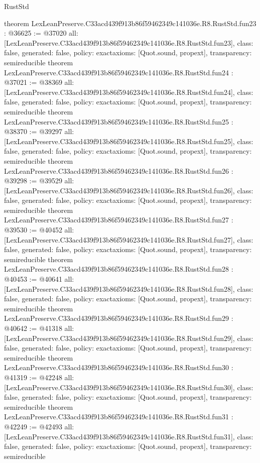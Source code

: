 \begin{lexlean}{RustStd}
\begin{coremodule}
{}
theorem LexLeanPreserve.C33acd439f913b86f59462349c141036e.R8.RustStd.fun23 : @36625 := @37020 {
  all: [LexLeanPreserve.C33acd439f913b86f59462349c141036e.R8.RustStd.fun23],
  class: false,
  generated: false,
  policy: exact{axioms: [Quot.sound, propext]},
  transparency: semireducible
}
theorem LexLeanPreserve.C33acd439f913b86f59462349c141036e.R8.RustStd.fun24 : @37021 := @38369 {
  all: [LexLeanPreserve.C33acd439f913b86f59462349c141036e.R8.RustStd.fun24],
  class: false,
  generated: false,
  policy: exact{axioms: [Quot.sound, propext]},
  transparency: semireducible
}
theorem LexLeanPreserve.C33acd439f913b86f59462349c141036e.R8.RustStd.fun25 : @38370 := @39297 {
  all: [LexLeanPreserve.C33acd439f913b86f59462349c141036e.R8.RustStd.fun25],
  class: false,
  generated: false,
  policy: exact{axioms: [Quot.sound, propext]},
  transparency: semireducible
}
theorem LexLeanPreserve.C33acd439f913b86f59462349c141036e.R8.RustStd.fun26 : @39298 := @39529 {
  all: [LexLeanPreserve.C33acd439f913b86f59462349c141036e.R8.RustStd.fun26],
  class: false,
  generated: false,
  policy: exact{axioms: [Quot.sound, propext]},
  transparency: semireducible
}
theorem LexLeanPreserve.C33acd439f913b86f59462349c141036e.R8.RustStd.fun27 : @39530 := @40452 {
  all: [LexLeanPreserve.C33acd439f913b86f59462349c141036e.R8.RustStd.fun27],
  class: false,
  generated: false,
  policy: exact{axioms: [Quot.sound, propext]},
  transparency: semireducible
}
theorem LexLeanPreserve.C33acd439f913b86f59462349c141036e.R8.RustStd.fun28 : @40453 := @40641 {
  all: [LexLeanPreserve.C33acd439f913b86f59462349c141036e.R8.RustStd.fun28],
  class: false,
  generated: false,
  policy: exact{axioms: [Quot.sound, propext]},
  transparency: semireducible
}
theorem LexLeanPreserve.C33acd439f913b86f59462349c141036e.R8.RustStd.fun29 : @40642 := @41318 {
  all: [LexLeanPreserve.C33acd439f913b86f59462349c141036e.R8.RustStd.fun29],
  class: false,
  generated: false,
  policy: exact{axioms: [Quot.sound, propext]},
  transparency: semireducible
}
theorem LexLeanPreserve.C33acd439f913b86f59462349c141036e.R8.RustStd.fun30 : @41319 := @42248 {
  all: [LexLeanPreserve.C33acd439f913b86f59462349c141036e.R8.RustStd.fun30],
  class: false,
  generated: false,
  policy: exact{axioms: [Quot.sound, propext]},
  transparency: semireducible
}
theorem LexLeanPreserve.C33acd439f913b86f59462349c141036e.R8.RustStd.fun31 : @42249 := @42493 {
  all: [LexLeanPreserve.C33acd439f913b86f59462349c141036e.R8.RustStd.fun31],
  class: false,
  generated: false,
  policy: exact{axioms: [Quot.sound, propext]},
  transparency: semireducible
}
\end{coremodule}
\end{lexlean}
